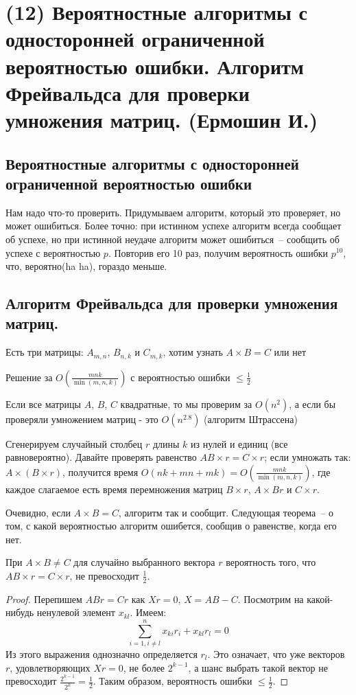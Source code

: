 \hypertarget{Freivalds}{}
\section{(12) Вероятностные алгоритмы с односторонней ограниченной вероятностью ошибки. Алгоритм Фрейвальдса для проверки умножения матриц. (Ермошин И.)}

\subsection{Вероятностные алгоритмы с односторонней ограниченной вероятностью ошибки}

Нам надо что-то проверить. Придумываем алгоритм, который это проверяет, но может ошибиться. Более точно: при истинном успехе алгоритм всегда сообщает об успехе, но при истинной неудаче алгоритм может ошибиться~-- сообщить об успехе с вероятностью $p$. Повторив его 10 раз, получим вероятность ошибки $p^{10}$, что, вероятно(ha ha), гораздо меньше.

\subsection{Алгоритм Фрейвальдса для проверки умножения матриц.}

Есть три матрицы: $A_{m,n}$, $B_{n,k}$ и $C_{m,k}$, хотим узнать $A\times B=C$ или нет

\begin{algodescription}{Решение за $O\left(\frac{mnk}{\min(m,n,k)}\right)$ с вероятностью ошибки $\le\frac{1}{2}$}

\begin{nb*}Если все матрицы $A$, $B$, $C$ квадратные, то мы проверим за $O(n^2)$, а если бы проверяли умножением матриц - это $O(n^{2.8})$ (алгоритм Штрассена)
\end{nb*}

Сгенерируем случайный столбец $r$ длины $k$ из нулей и единиц (все равновероятно). Давайте проверять равенство $AB\times r=C\times r$; если умножать так: $A\times (B\times r)$, получится время $O(nk+mn+mk)=O\left(\frac{mnk}{\min(m,n,k)}\right)$, где каждое слагаемое есть время перемножения матриц $B\times r$, $A \times Br$ и $C\times r$.
\end{algodescription}

Очевидно, если $A\times B=C$, алгоритм так и сообщит. Следующая теорема~-- о том, с какой вероятностью алгоритм ошибется, сообщив о равенстве, когда его нет.

\begin{theorem*} 
    При $A\times B \neq C$ для случайно выбранного вектора $r$ вероятность того, что $AB\times r = C\times r$, не превосходит $\frac{1}{2}$.
\end{theorem*}
\begin{proof}
Перепишем $ABr = Cr$ как $Xr=0$, $X=AB-C$. Посмотрим на какой-нибудь ненулевой элемент $x_{kl}$. Имеем:
$$\sum_{i=1, i\ne l}^{n} x_{ki}r_i+x_{kl}r_l=0$$
Из этого выражения однозначно определяется $r_l$. Это означает, что уже векторов $r$, удовлетворяющих $Xr=0$, не более $2^{k-1}$, а шанс выбрать такой вектор не превосходит $\frac{2^{k-1}}{2^k} = \frac{1}{2}$. Таким образом, вероятность ошибки $\le\frac{1}{2}$. \end{proof}
